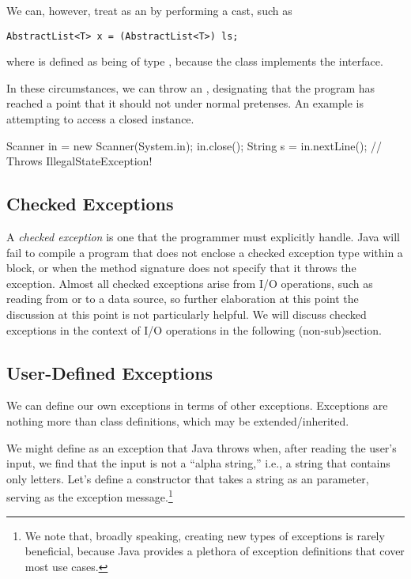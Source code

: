 We can, however, treat  as an  by performing a cast, such as

\begin{small}
\begin{verbatim}
AbstractList<T> x = (AbstractList<T>) ls;
\end{verbatim}
\end{small}

where  is defined as being of type , because the  class implements the  interface.

In these circumstances, we can throw an , designating that the program has reached a point that it should not under normal pretenses. 
An example is attempting to access a closed  instance.
\begin{verbnobox}[\small]
Scanner in = new Scanner(System.in);
in.close();
String s = in.nextLine(); // Throws IllegalStateException!
\end{verbnobox}
\subsection{Checked Exceptions}

A \emph{checked exception} is one that the programmer must explicitly handle. 
Java will fail to compile a program that does not enclose a checked exception type within a  block, or when the method signature does not specify that it throws the exception. 
Almost all checked exceptions arise from I/O operations, such as reading from or to a data source, so further elaboration at this point the discussion at this point is not particularly helpful.
We will discuss checked exceptions in the context of I/O operations in the following (non-sub)section.

\subsection{User-Defined Exceptions}
We can define our own exceptions in terms of other exceptions. 
Exceptions are nothing more than class definitions, which may be extended/inherited. 

We might define  as an exception that Java throws when, after reading the user's input, we find that the input is not a ``alpha string,'' i.e., a string that contains only letters. 
Let's define a constructor that takes a string as an parameter, serving as the exception message.\footnote{We note that, broadly speaking, creating new types of exceptions is rarely beneficial, because Java provides a plethora of exception definitions that cover most use cases.}

